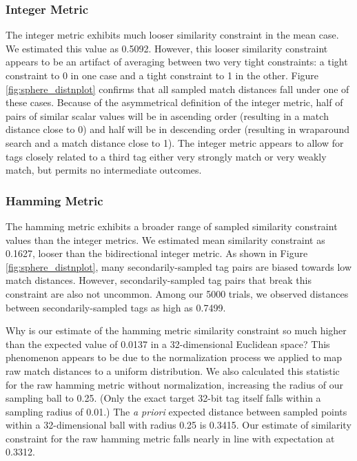 \subsubsection{Integer Metric}

The integer metric exhibits much looser similarity constraint in the mean case.
We estimated this value as 0.5092.
However, this looser similarity constraint appears to be an artifact of averaging between two very tight constraints: a tight constraint to 0 in one case and a tight constraint to 1 in the other.
Figure \ref{fig:sphere_distnplot} confirms that all sampled match distances fall under one of these cases.
Because of the asymmetrical definition of the integer metric, half of pairs of similar scalar values will be in ascending order (resulting in a match distance close to 0) and half will be in descending order (resulting in wraparound search and a match distance close to 1).
The integer metric appears to allow for tags closely related to a third tag either very strongly match or very weakly match, but permits no intermediate outcomes.

\subsubsection{Hamming Metric}

The hamming metric exhibits a broader range of sampled similarity constraint values than the integer metrics.
We estimated mean similarity constraint as 0.1627, looser than the bidirectional integer metric.
As shown in Figure \ref{fig:sphere_distnplot}, many secondarily-sampled tag pairs are biased towards low match distances.
However, secondarily-sampled tag pairs that break this constraint are also not uncommon.
Among our 5000 trials, we observed distances between secondarily-sampled tags as high as 0.7499.

Why is our estimate of the hamming metric similarity constraint so much higher than the expected value of 0.0137 in a 32-dimensional Euclidean space?
This phenomenon appears to be due to the normalization process we applied to map raw match distances to a uniform distribution.
We also calculated this statistic for the raw hamming metric without normalization, increasing the radius of our sampling ball to 0.25.
(Only the exact target 32-bit tag itself falls within a sampling radius of 0.01.)
The \textit{a priori} expected distance between sampled points within a 32-dimensional ball with radius 0.25 is 0.3415.
Our estimate of similarity constraint for the raw hamming metric falls nearly in line with expectation at 0.3312.

